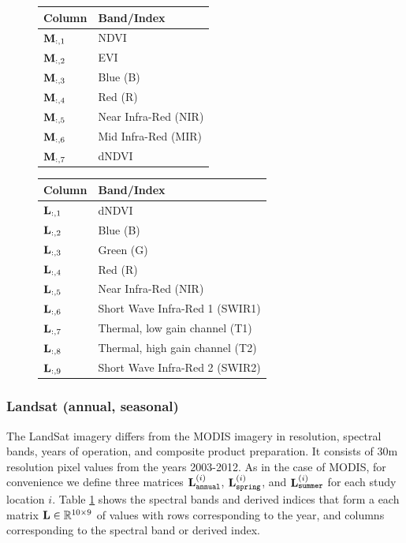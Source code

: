 \def\year{2017}\relax \documentclass[letterpaper]{article}
\begin{document}
  \begin{figure}
  \begin{minipage}[b]{0.49\textwidth}
    \centering
\begin{tabularx}{\linewidth}{@{ }l X@{ }}
		\toprule[.2em]
		{\bf Column} &{\bf Band/Index} \\
		\midrule
		${\bf M}_{:,1}$& NDVI\\	
		${\bf M}_{:,2}$& EVI\\
		${\bf M}_{:,3}$& Blue (B)\\
		${\bf M}_{:,4}$& Red (R) \\
		${\bf M}_{:,5}$& Near Infra-Red (NIR)\\ 
		${\bf M}_{:,6}$& Mid Infra-Red (MIR)\\
		${\bf M}_{:,7}$& dNDVI\\
		\bottomrule[.2em]
	\end{tabularx}
 \label{tab:modis}
  \end{minipage}
  \hfill
  \begin{minipage}[b]{0.49\textwidth}
    \centering
  \begin{tabularx}{\linewidth}{@{ }l X@{ }}
		\toprule[.2em]
		{\bf Column} &{\bf Band/Index} \\
		\midrule
		${\bf L}_{:,1}$& dNDVI\\
		${\bf L}_{:,2}$& Blue (B)\\
		${\bf L}_{:,3}$& Green (G) \\
		${\bf L}_{:,4}$& Red (R) \\
		${\bf L}_{:,5}$& Near Infra-Red (NIR)\\ 
		${\bf L}_{:,6}$& Short Wave Infra-Red 1 (SWIR1)\\ 
		${\bf L}_{:,7}$& Thermal, low gain channel  (T1)\\
		${\bf L}_{:,8}$& Thermal, high gain channel (T2)\\
		${\bf L}_{:,9}$& Short Wave Infra-Red 2 (SWIR2)\\
		\bottomrule[.2em]
	\end{tabularx}
      \label{tab:landsat}
    \end{minipage}
  \end{figure}

\subsubsection{Landsat (annual, seasonal)}
The LandSat imagery differs from the MODIS imagery in resolution, spectral bands, years of operation, and composite product preparation. 
It consists of 30m resolution pixel values from the years 2003-2012. As in the case of MODIS, for convenience we define three matrices ${\bf L}_{\texttt{annual}}^{(i)}$, ${\bf L}_{\texttt{spring}}^{(i)}$, and ${\bf L}_{\texttt{summer}}^{(i)}$ for each study location $i$.  Table \ref{tab:landsat} shows the spectral bands and derived indices that form a each matrix  ${\bf L} \in \mathbb{R}^{10\times 9}$ of values with rows corresponding to the year, and columns corresponding to the spectral band or derived index. 
\end{document}
